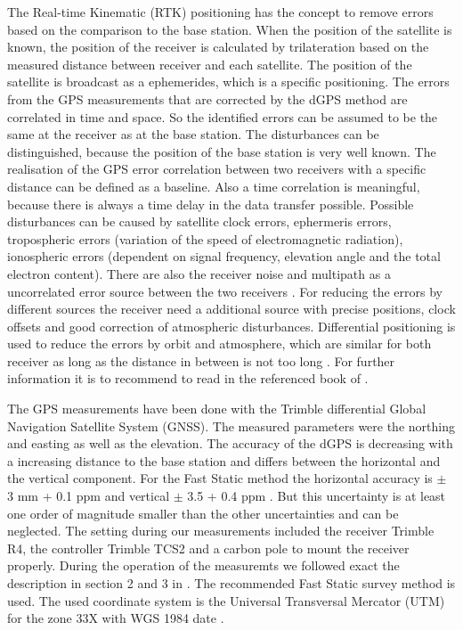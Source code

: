 The Real-time Kinematic (RTK) positioning has the concept to remove errors based on the comparison to the base station.
When the position of the satellite is known, the position of the receiver is calculated by trilateration based on the measured distance between receiver and each satellite.
The position of the satellite is broadcast as a ephemerides, which is a specific positioning.
The errors from the GPS measurements that are corrected by the dGPS method are correlated in time and space.
So the identified errors can be assumed to be the same at the receiver as at the base station.
The disturbances can be distinguished, because the position of the base station is very well known.
The realisation of the GPS error correlation between two receivers with a specific distance can be defined as a baseline.
Also a time correlation is meaningful, because there is always a time delay in the data transfer possible.
Possible disturbances can be caused by satellite clock errors, ephermeris errors, tropospheric errors (variation of the speed of electromagnetic radiation), ionospheric errors (dependent on signal frequency, elevation angle and the total electron content). 
There are also the receiver noise and multipath as a uncorrelated error source between the two receivers \citep{UGPS}.
For reducing the errors by different sources the receiver need a additional source with precise positions, clock offsets and good correction of atmospheric disturbances. 
Differential positioning is used to reduce the errors by orbit and atmosphere, which are similar for both receiver as long as the distance in between is not too long \citep{Trprocess}.
For further information it is to recommend to read in the referenced book of \citep{UGPS}.
\medskip

The GPS measurements have been done with the Trimble differential Global Navigation Satellite System (GNSS). 
The measured parameters were the northing and easting as well as the elevation.
The accuracy of the dGPS is decreasing with a increasing distance to the base station and differs between the horizontal and the vertical component.
For the Fast Static method the horizontal accuracy is $ \pm $ 3 mm + 0.1 ppm and vertical $ \pm $ 3.5 + 0.4 ppm  \citep{Trquickstart}.
But this uncertainty is at least one order of magnitude smaller than the other uncertainties and can be neglected.  
The setting during our measurements included the receiver Trimble R4,
the controller Trimble TCS2 and a carbon pole to mount the receiver properly.
During the operation of the measuremts we followed exact the description in section 2 and 3 in \cite{Trquickstart}. 
The recommended Fast Static survey method is used.
The used coordinate system is the Universal Transversal Mercator (UTM) for the zone 33X with WGS 1984 date \citep{Trquickstart}. 
\medskip

